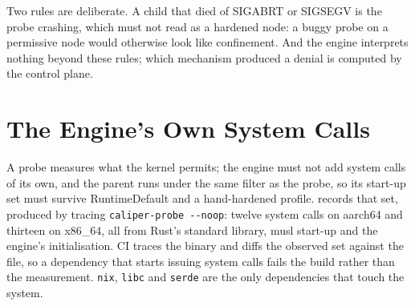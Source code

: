 \begin{center}
\end{center}

Two rules are deliberate. A child that died of SIGABRT or SIGSEGV is the probe crashing, which must not read as a hardened node: a buggy probe on a permissive node would otherwise look like confinement. And the engine interprets nothing beyond these rules; which mechanism produced a denial is computed by the control plane.

\section{The Engine's Own System Calls}
\label{sec:baseline}

A probe measures what the kernel permits; the engine must not add system calls of its own, and the parent runs under the same filter as the probe, so its start-up set must survive RuntimeDefault and a hand-hardened profile.  records that set, produced by tracing \texttt{caliper-probe -{}-noop}: twelve system calls on aarch64 and thirteen on x86\_64, all from Rust's standard library, musl start-up and the engine's initialisation. CI traces the binary and diffs the observed set against the file, so a dependency that starts issuing system calls fails the build rather than the measurement. \texttt{nix}, \texttt{libc} and \texttt{serde} are the only dependencies that touch the system.


